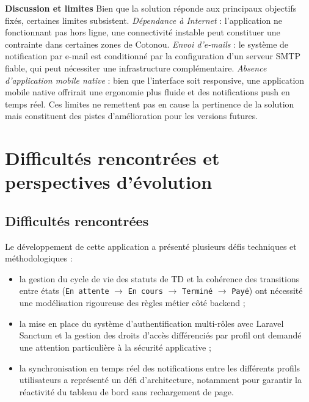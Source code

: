 \textbf{Discussion et limites} \quad Bien que la solution réponde aux
principaux objectifs fixés, certaines limites subsistent.
\textit{Dépendance à Internet} : l'application ne fonctionnant pas hors
ligne, une connectivité instable peut constituer une contrainte dans
certaines zones de Cotonou.
\textit{Envoi d'e-mails} : le système de notification par e-mail
est conditionné par la configuration d'un serveur SMTP fiable,
qui peut nécessiter une infrastructure complémentaire.
\textit{Absence d'application mobile native} : bien que l'interface
soit responsive, une application mobile native offrirait une ergonomie
plus fluide et des notifications push en temps réel.
Ces limites ne remettent pas en cause la pertinence de la solution
mais constituent des pistes d'amélioration pour les versions futures.

\section{Difficultés rencontrées et perspectives d'évolution}

\subsection{Difficultés rencontrées}

Le développement de cette application a présenté plusieurs défis
techniques et méthodologiques :

\begin{itemize}
    \item la gestion du cycle de vie des statuts de TD et la
    cohérence des transitions entre états (\texttt{En attente}
    $\rightarrow$ \texttt{En cours} $\rightarrow$ \texttt{Terminé}
    $\rightarrow$ \texttt{Payé}) ont nécessité une modélisation
    rigoureuse des règles métier côté backend ;

    \item la mise en place du système d'authentification multi-rôles
    avec Laravel Sanctum et la gestion des droits d'accès différenciés
    par profil ont demandé une attention particulière à la sécurité
    applicative ;

    \item la synchronisation en temps réel des notifications entre
    les différents profils utilisateurs a représenté un défi
    d'architecture, notamment pour garantir la réactivité du tableau
    de bord sans rechargement de page.
\end{itemize}


